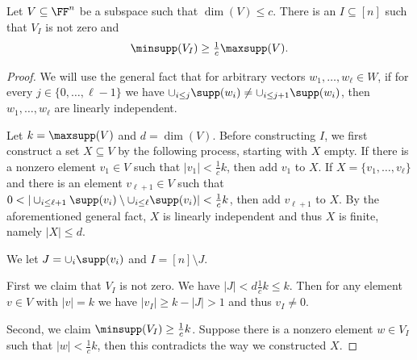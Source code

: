 \begin{lemma}\label{lem:minsupp}
Let $V \subseteq \FF^n$ be a subspace such that $\dim(V) \leq c$.  
There is an $I \subseteq [n]$ such that $V_I$ is not zero and
\[
\minsupp(V_I) \geq \tfrac1c \maxsupp(V).
\]
\end{lemma}
\begin{proof}
    We will use the general fact that for arbitrary vectors $w_1, \ldots, w_\ell \in W$, if for every $j\in \{0, \ldots, \ell-1\}$ we have $\cup_{i \leq j} \supp(w_i) \neq \cup_{i \leq j + 1} \supp(w_i)$, then $w_1, \ldots, w_\ell$ are linearly independent.

    Let $k = \maxsupp(V)$ and $d = \dim(V)$.
    Before constructing $I$, we first construct a set $X \subseteq V$ by the following process, starting with $X$ empty.
    If there is a nonzero element $v_1 \in V$ such that $|v_1| < \tfrac1c k$, then add $v_1$ to $X$.
    If $X = \{v_1, \ldots, v_\ell\}$ and there is an element $v_{\ell + 1} \in V$ such that 
    $0 < |\cup_{i \leq \ell+1} \supp(v_i) \setminus \cup_{i \leq \ell} \supp(v_i)| < \tfrac1c k$, then add $v_{\ell+1}$ to $X$.
    By the aforementioned general fact, $X$ is linearly independent and thus $X$ is finite, namely $|X| \leq d$.

    
    We let $J = \cup_i \supp(v_i)$ and $I = [n] \setminus J$.
    
    First we claim that $V_I$ is not zero. We have $|J| < d\tfrac1c k \leq k$.
    Then for any element $v \in V$ with $|v| = k$ we have $|v_I| \geq k - |J| > 1$ and thus $v_I \neq 0$.
    
    Second, we claim $\minsupp(V_I) \geq \tfrac1c k$.  Suppose there is a nonzero element $w \in V_I$ such that $|w| < \tfrac1c k$, then this contradicts the way we constructed $X$.
\end{proof}


